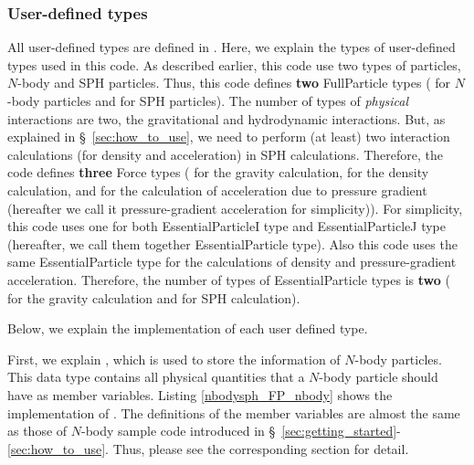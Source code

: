 \subsubsection{User-defined types}
All user-defined types are defined in . Here, we explain the types of user-defined types used in this code. As described earlier, this code use two types of particles, $N$-body and SPH particles. Thus, this code defines \textbf{two} \textsf{FullParticle} types ( for $N$-body particles and  for SPH particles). The number of types of \textit{physical} interactions are two, the gravitational and hydrodynamic interactions. But, as explained in \S~\ref{sec:how_to_use}, we need to perform (at least) two interaction calculations (for density and acceleration) in SPH calculations. Therefore, the code defines \textbf{three} \textsf{Force} types ( for the gravity calculation,  for the density calculation, and  for the calculation of acceleration due to pressure gradient (hereafter we call it pressure-gradient acceleration for simplicity)). For simplicity, this code uses one \structure for both \textsf{EssentialParticleI} type and \textsf{EssentialParticleJ} type (hereafter, we call them together \textsf{EssentialParticle} type). Also this code uses the same \textsf{EssentialParticle} type for the calculations of density and pressure-gradient acceleration. Therefore, the number of types of \textsf{EssentialParticle} types is \textbf{two} ( for the gravity calculation and  for SPH calculation).

Below, we explain the implementation of each user defined type.

First, we explain , which is used to store the information of $N$-body particles. This data type contains all physical quantities that a $N$-body particle should have as member variables. Listing \ref{nbodysph_FP_nbody} shows the implementation of . The definitions of the member variables  are almost the same as those of $N$-body sample code introduced in \S~\ref{sec:getting_started}-\ref{sec:how_to_use}. Thus, please see the corresponding section for detail.

